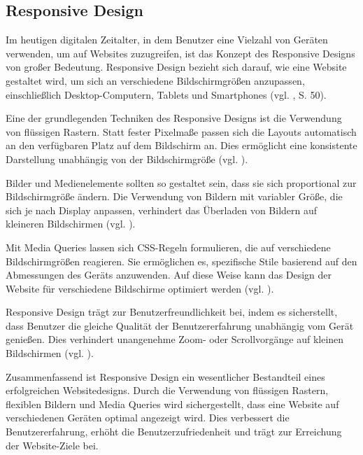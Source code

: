 \documentclass[fontsize=12pt,openright,oneside,paper=a4,BCOR=1cm]{scrbook}
\begin{document}
\subsection{Responsive Design}
Im heutigen digitalen Zeitalter, in dem Benutzer eine Vielzahl von Geräten verwenden, um auf Websites zuzugreifen, ist das Konzept des Responsive Designs von großer Bedeutung. Responsive Design bezieht sich darauf, wie eine Website gestaltet wird, um sich an verschiedene Bildschirmgrößen anzupassen, einschließlich Desktop-Computern, Tablets und Smartphones (vgl. \cite{almeida2017role}, S. 50).	

Eine der grundlegenden Techniken des Responsive Designs ist die Verwendung von flüssigen Rastern. Statt fester Pixelmaße passen sich die Layouts automatisch an den verfügbaren Platz auf dem Bildschirm an. Dies ermöglicht eine konsistente Darstellung unabhängig von der Bildschirmgröße (vgl. \cite{kadlec2012implementing}).

Bilder und Medienelemente sollten so gestaltet sein, dass sie sich proportional zur Bildschirmgröße ändern. Die Verwendung von Bildern mit variabler Größe, die sich je nach Display anpassen, verhindert das Überladen von Bildern auf kleineren Bildschirmen (vgl. \cite{kadlec2012implementing}). 

Mit Media Queries lassen sich CSS-Regeln formulieren, die auf verschiedene Bildschirmgrößen reagieren. Sie ermöglichen es, spezifische Stile basierend auf den Abmessungen des Geräts anzuwenden. Auf diese Weise kann das Design der Website für verschiedene Bildschirme optimiert werden (vgl. \cite{kadlec2012implementing}). 

Responsive Design trägt zur Benutzerfreundlichkeit bei, indem es sicherstellt, dass Benutzer die gleiche Qualität der Benutzererfahrung unabhängig vom Gerät genießen. Dies verhindert unangenehme Zoom- oder Scrollvorgänge auf kleinen Bildschirmen (vgl. \cite{activeweb}). 

Zusammenfassend ist Responsive Design ein wesentlicher Bestandteil eines erfolgreichen Websitedesigns. Durch die Verwendung von flüssigen Rastern, flexiblen Bildern und Media Queries wird sichergestellt, dass eine Website auf verschiedenen Geräten optimal angezeigt wird. Dies verbessert die Benutzererfahrung, erhöht die Benutzerzufriedenheit und trägt zur Erreichung der Website-Ziele bei.

\end{document}
